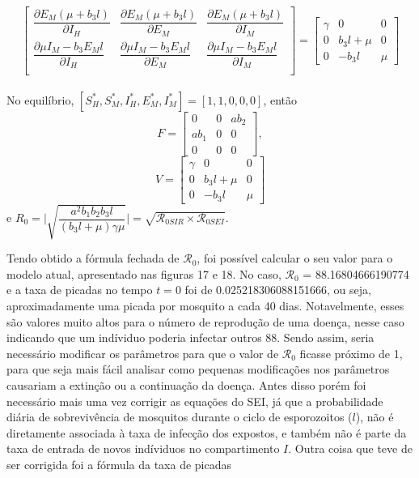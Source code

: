 \documentclass[12pt]{article}
\begin{document}
\begin{itemize}
$$\begin{bmatrix}
\dfrac{\partial E_M (\mu + b_3 l)}{\partial I_H} & \dfrac{\partial E_M (\mu + b_3 l)}{\partial E_M} & \dfrac{\partial E_M (\mu + b_3 l)}{\partial I_M}\\
\dfrac{\partial \mu I_M - b_3 E_M l}{\partial I_H} & \dfrac{\partial \mu I_M - b_3 E_M l}{\partial E_M} & \dfrac{\partial \mu I_M - b_3 E_M l}{\partial I_M}\\
\end{bmatrix} = 
\begin{bmatrix}
\gamma & 0 & 0\\
0 & b_3l+\mu & 0\\
0 & -b_3l & \mu
\end{bmatrix}$$
\\No equilíbrio, $[S_H^*, S_M^*, I_H^*, E_M^*, I_M^*] = [1,1,0,0,0]$, então $$F=\begin{bmatrix}
0 & 0 & ab_2\\
ab_1 & 0 & 0\\
0 & 0 & 0
\end{bmatrix},$$
$$V = \begin{bmatrix}
\gamma & 0 & 0\\
0 & b_3l+\mu & 0\\
0 & -b_3l & \mu
\end{bmatrix}$$ 
e $R_0 = \Big | \sqrt{\dfrac{a^2 b_1 b_2 b_3 l}{(b_3 l + \mu)\gamma \mu}}\Big | = 
\sqrt{\mathcal{R}_{0 SIR} \times \mathcal{R}_{0 SEI}}$. 

\end{itemize}
Tendo obtido a fórmula fechada de $\mathcal{R}_0$, foi possível calcular o seu valor para o 
modelo atual, apresentado nas figuras 17 e 18. No caso, $\mathcal{R}_0$ = 88.16804666190774
e a taxa de picadas no tempo $t=0$ foi de 0.025218306088151666, ou seja, aproximadamente 
uma picada por mosquito a cada 40 dias. Notavelmente, esses são valores muito altos para 
o número de reprodução de uma doença, nesse caso indicando que um indíviduo poderia infectar 
outros 88. Sendo assim, seria necessário modificar os parâmetros para que o valor de 
$\mathcal{R}_0$ ficasse próximo de 1, para que seja mais fácil analisar como pequenas 
modificações nos parâmetros causariam a extinção ou a continuação da doença. Antes disso porém 
foi necessário mais uma vez corrigir as equações do SEI, já que a probabilidade diária de 
sobrevivência de mosquitos durante o ciclo de esporozoitos ($l$), não é diretamente associada 
à taxa de infecção dos expostos, e também não é parte da taxa de entrada de novos indíviduos 
no compartimento $I$. Outra coisa que teve de ser corrigida foi a fórmula da taxa de picadas 
\end{document}
